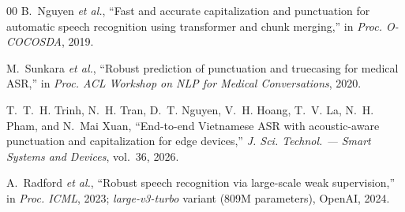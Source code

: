 \documentclass[conference,onecolumn]{IEEEtran}
\begin{document}
\begin{thebibliography}{00}
B.~Nguyen \emph{et al.}, ``Fast and accurate capitalization and punctuation for
automatic speech recognition using transformer and chunk merging,'' in
\emph{Proc. O-COCOSDA}, 2019.

M.~Sunkara \emph{et al.}, ``Robust prediction of punctuation and truecasing for
medical ASR,'' in \emph{Proc. ACL Workshop on NLP for Medical Conversations},
2020.

T.~T.~H. Trinh, N.~H. Tran, D.~T. Nguyen, V.~H. Hoang, T.~V. La, N.~H. Pham, and
N.~Mai Xuan, ``End-to-end Vietnamese ASR with acoustic-aware punctuation and
capitalization for edge devices,'' \emph{J. Sci. Technol. --- Smart Systems and
Devices}, vol.~36, 2026.

A.~Radford \emph{et al.}, ``Robust speech recognition via large-scale weak
supervision,'' in \emph{Proc. ICML}, 2023; \emph{large-v3-turbo} variant
(809M parameters), OpenAI, 2024.

\end{thebibliography}

\end{document}
